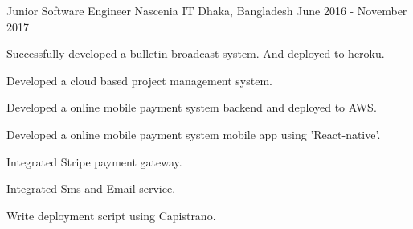 \begin{cventries}
\cventry
    {Junior Software Engineer}
    {Nascenia IT}
    {Dhaka, Bangladesh}
    {June 2016 - November 2017}
    {
      \begin{cvitemsNumber}[Responsibilities:]
        \vspace{1mm}
        \item {Successfully developed a bulletin broadcast system. And deployed to heroku.}
        \vspace{1mm}
        \item {Developed a cloud based project management system.}
        \vspace{1mm}
        \item {Developed a online mobile payment system backend and deployed to
                AWS.}
        \vspace{1mm}
        \item {Developed a online mobile payment system mobile app using 'React-native'.}
        \vspace{1mm}
        \item {Integrated Stripe payment gateway.}
        \vspace{1mm}
        \item {Integrated Sms and Email service.}
        \vspace{1mm}
        \item {Write deployment script using Capistrano.}
        \vspace{1mm}
      \end{cvitemsNumber}
    }
\end{cventries}
